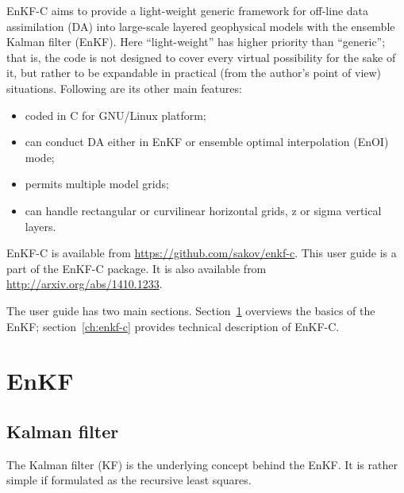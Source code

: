 \documentclass[11pt]{report}
\begin{document}
EnKF-C aims to provide a light-weight generic framework for off-line data assimilation (DA) into large-scale layered geophysical models with the ensemble Kalman filter (EnKF).
Here ``light-weight'' has higher priority than ``generic''; that is, the code is not designed to cover every virtual possibility for the sake of it, but rather to be expandable in practical (from the author's point of view) situations.
Following are its other main features:
\begin{itemize}
\item coded in C for GNU/Linux platform;
\item can conduct DA either in EnKF or ensemble optimal interpolation (EnOI) mode;
\item permits multiple model grids;
\item can handle rectangular or curvilinear horizontal grids, z or sigma vertical layers.
\end{itemize}

EnKF-C is available from \url{https://github.com/sakov/enkf-c}.
This user guide is a part of the EnKF-C package. 
It is also available from \url{http://arxiv.org/abs/1410.1233}.

The user guide has two main sections.
Section~\ref{ch:enkf} overviews the basics of the EnKF; section~\ref{ch:enkf-c} provides technical description of EnKF-C.

\chapter{EnKF}
\label{ch:enkf}

\section{Kalman filter}

The Kalman filter (KF) is the underlying concept behind the EnKF.
It is rather simple if formulated as the recursive least squares.
\end{document}

